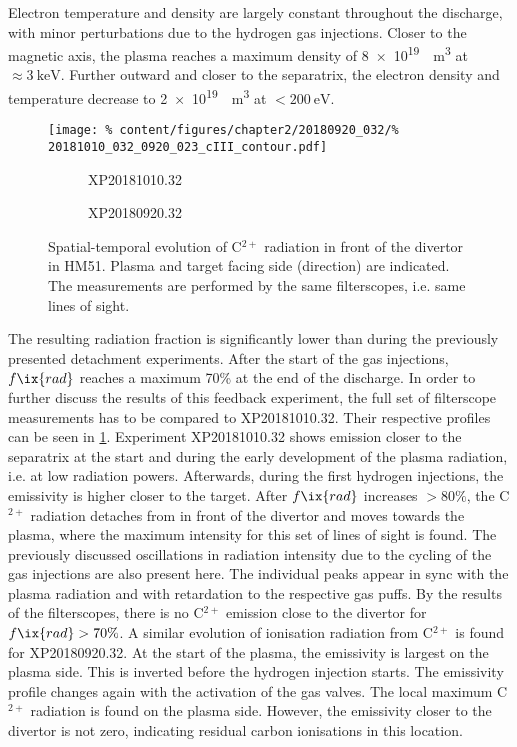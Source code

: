                 Electron temperature and density are largely constant throughout the discharge, with minor perturbations due to the hydrogen gas injections. Closer to the magnetic axis, the plasma reaches a maximum density of \SI[per-mode=reciprocal]{8e19}{\per\cubic\meter} at $\approx\SI{3}{\kilo\electronvolt}$. Further outward and closer to the separatrix, the electron density and temperature decrease to \SI[per-mode=reciprocal]{2e19}{\per\cubic\meter} at $<\SI{200}{\electronvolt}$.\\%
%
                \begin{figure}[t]%
                    \centering%
                    \texttt{[image: \%
                        content/figures/chapter2/20180920\_032/\%
                        20181010\_032\_0920\_023\_cIII\_contour.pdf]}\\%
                    \begin{subfigure}{.48\textwidth}%
                        \caption{XP20181010.32}\end{subfigure}%
                    \begin{subfigure}{.48\textwidth}%
                        \caption{XP20180920.32}\end{subfigure}%
                    \caption{Spatial-temporal evolution of C$^{2+}$ radiation in front of the divertor in HM51. Plasma and target facing side (direction) are indicated. The measurements are performed by the same filterscopes, i.e. same lines of sight.}\label{fig:20180920.32_cIII}%
                \end{figure}%
%
                The resulting radiation fraction is significantly lower than during the previously presented detachment experiments. After the start of the gas injections, $f\ix{rad}$ reaches a maximum 70\% at the end of the discharge. In order to further discuss the results of this feedback experiment, the full set of filterscope measurements has to be compared to XP20181010.32. Their respective profiles can be seen in \cref{fig:20180920.32_cIII}. Experiment XP20181010.32 shows emission closer to the separatrix at the start and during the early development of the plasma radiation, i.e. at low radiation powers. Afterwards, during the first hydrogen injections, the emissivity is higher closer to the target. After $f\ix{rad}$ increases $>80\%$, the C$^{2+}$ radiation detaches from in front of the divertor and moves towards the plasma, where the maximum intensity for this set of lines of sight is found. The previously discussed oscillations in radiation intensity due to the cycling of the gas injections are also present here. The individual peaks appear in sync with the plasma radiation and with retardation to the respective gas puffs. By the results of the filterscopes, there is no C$^{2+}$ emission close to the divertor for $f\ix{rad}>70\%$. A similar evolution of ionisation radiation from C$^{2+}$ is found for XP20180920.32. At the start of the plasma, the emissivity is largest on the plasma side. This is inverted before the hydrogen injection starts. The emissivity profile changes again with the activation of the gas valves. The local maximum C$^{2+}$ radiation is found on the plasma side. However, the emissivity closer to the divertor is not zero, indicating residual carbon ionisations in this location.\\%
